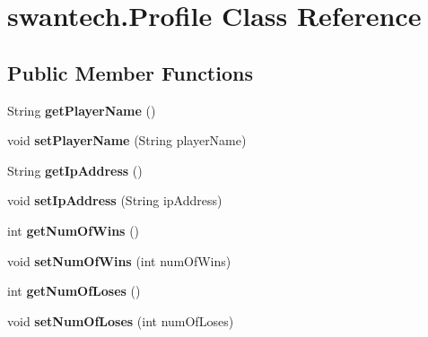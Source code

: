 \hypertarget{classswantech_1_1_profile}{}\section{swantech.\+Profile Class Reference}
\label{classswantech_1_1_profile}
\subsection*{Public Member Functions}
\begin{DoxyCompactItemize}
\item 
\hypertarget{classswantech_1_1_profile_a4fa727fa841a32bead393a36ad2a9ade}{}String {\bfseries get\+Player\+Name} ()\label{classswantech_1_1_profile_a4fa727fa841a32bead393a36ad2a9ade}

\item 
\hypertarget{classswantech_1_1_profile_abb0c2fbf2fe87270309262618fc6b520}{}void {\bfseries set\+Player\+Name} (String player\+Name)\label{classswantech_1_1_profile_abb0c2fbf2fe87270309262618fc6b520}

\item 
\hypertarget{classswantech_1_1_profile_a95aa76f7356b0968c52b80a2c808ddc0}{}String {\bfseries get\+Ip\+Address} ()\label{classswantech_1_1_profile_a95aa76f7356b0968c52b80a2c808ddc0}

\item 
\hypertarget{classswantech_1_1_profile_ab1cba5452c381d179e7014779b808e9a}{}void {\bfseries set\+Ip\+Address} (String ip\+Address)\label{classswantech_1_1_profile_ab1cba5452c381d179e7014779b808e9a}

\item 
\hypertarget{classswantech_1_1_profile_a38c4768eb0ed9e5f27979bbbda047266}{}int {\bfseries get\+Num\+Of\+Wins} ()\label{classswantech_1_1_profile_a38c4768eb0ed9e5f27979bbbda047266}

\item 
\hypertarget{classswantech_1_1_profile_a46efde79969272246dce4af13350dc78}{}void {\bfseries set\+Num\+Of\+Wins} (int num\+Of\+Wins)\label{classswantech_1_1_profile_a46efde79969272246dce4af13350dc78}

\item 
\hypertarget{classswantech_1_1_profile_af9502a45d867314ca57cc4cafaa3fd41}{}int {\bfseries get\+Num\+Of\+Loses} ()\label{classswantech_1_1_profile_af9502a45d867314ca57cc4cafaa3fd41}

\item 
\hypertarget{classswantech_1_1_profile_ab73d9c65b00ec51661d3b23d17a2643a}{}void {\bfseries set\+Num\+Of\+Loses} (int num\+Of\+Loses)\label{classswantech_1_1_profile_ab73d9c65b00ec51661d3b23d17a2643a}


\end{DoxyCompactItemize}
